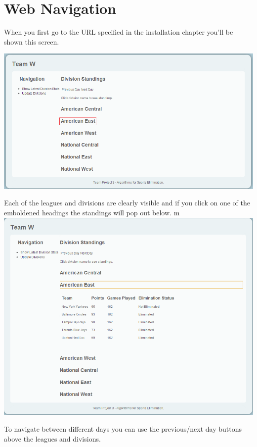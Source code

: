 
\section{Web Navigation}

When you first go to the URL specified in the installation chapter you'll be shown this screen.

\includegraphics[width=\linewidth,keepaspectratio]{images/userManualWeb1.png}

Each of the leagues and divisions are clearly visible and if you click on one of the emboldened headings the standings will pop out below.
m
\includegraphics[width=\linewidth,keepaspectratio]{images/userManualWeb2.png}

To navigate between different days you can use the previous/next day buttons above the leagues and divisions.

